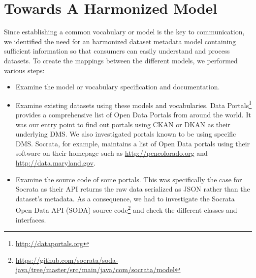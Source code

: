 
\section{Towards A Harmonized Model}
\label{section:hdl}
Since establishing a common vocabulary or model is the key to communication, we identified the need for an harmonized dataset metadata model containing sufficient information so that consumers can easily understand and process datasets. To create the mappings between the different models, we performed various steps:
\begin{itemize}
  \item Examine the model or vocabulary specification and documentation.
  \item Examine existing datasets using these models and vocabularies. Data Portals\footnote{\url{http://dataportals.org}} provides a comprehensive list of Open Data Portals from around the world. It was our entry point to find out portals using CKAN or DKAN as their underlying DMS. We also investigated portals known to be using specific DMS. Socrata, for example, maintains a list of Open Data portals using their software on their homepage such as \url{http://pencolorado.org} and \url{http://data.maryland.gov}.
  \item Examine the source code of some portals. This was specifically the case for Socrata as their API returns the raw data serialized as JSON rather than the dataset's metadata. As a consequence, we had to investigate the Socrata Open Data API (SODA) source code\footnote{\url{https://github.com/socrata/soda-java/tree/master/src/main/java/com/socrata/model}} and check the different classes and interfaces.
\end{itemize}

